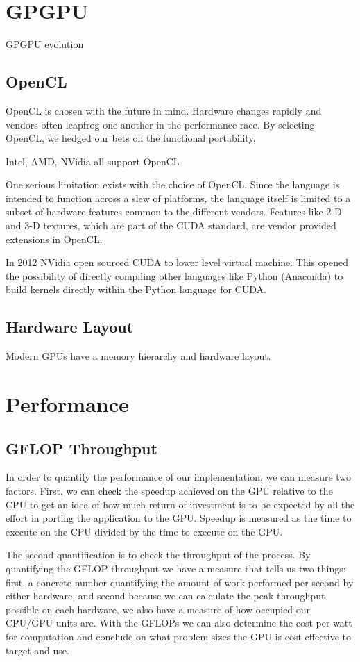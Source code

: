 \documentclass{report}
\begin{document}
\section{GPGPU}
GPGPU evolution
\subsection{OpenCL}
OpenCL is chosen with the future in mind. Hardware changes rapidly and vendors often leapfrog one another in the performance race. By selecting OpenCL, we hedged our bets on the functional portability. 

Intel, AMD, NVidia all support OpenCL

One serious limitation exists with the choice of OpenCL. Since the language is intended to function across a slew of platforms, the language itself is limited to a subset of hardware features common to the different vendors. Features like 2-D and 3-D textures, which are part of the CUDA standard, are vendor provided extensions in OpenCL. 

In 2012 NVidia open sourced CUDA to lower level virtual machine. This opened the possibility of directly compiling other languages like Python (Anaconda) to build kernels directly within the Python language for CUDA. 

\subsection{Hardware Layout}
Modern GPUs have a memory hierarchy and hardware layout. 

\section{Performance}
\subsection{GFLOP Throughput}
In order to quantify the performance of our implementation, we can measure two
factors. First, we can check the speedup achieved on the GPU relative to the
CPU to get an idea of how much return of investment is to be expected by all
the effort in porting the application to the GPU. Speedup is measured as the
time to execute on the CPU divided by the time to execute on the GPU. 

The second quantification is to check the throughput of the process. By
quantifying the GFLOP throughput we have a measure that tells us two things:
first, a concrete number quantifying the amount of work performed per second by
either hardware, and second because we can calculate the peak throughput possible on
each hardware, we also have a measure of how occupied our CPU/GPU units are.
With the GFLOPs we can also determine the cost per watt for computation and
conclude on what problem sizes the GPU is cost effective to target and use. 
\end{document}
